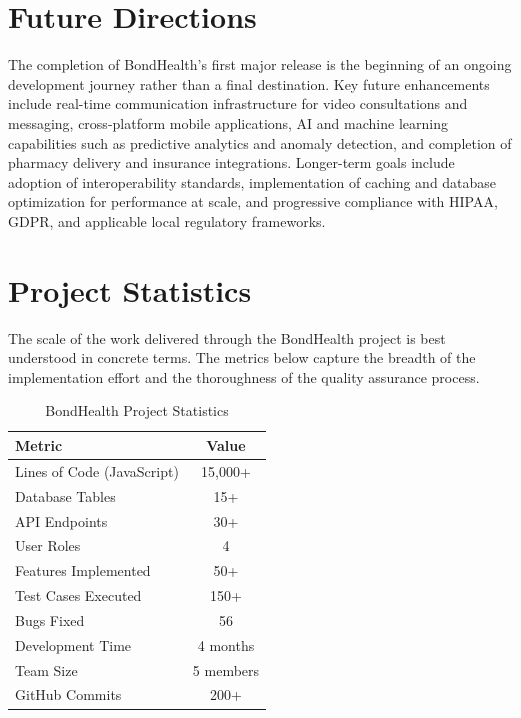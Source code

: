 \section{Future Directions}

\noindent The completion of BondHealth's first major release is the beginning of an ongoing development journey rather than a final destination. Key future enhancements include real-time communication infrastructure for video consultations and messaging, cross-platform mobile applications, AI and machine learning capabilities such as predictive analytics and anomaly detection, and completion of pharmacy delivery and insurance integrations. Longer-term goals include adoption of interoperability standards, implementation of caching and database optimization for performance at scale, and progressive compliance with HIPAA, GDPR, and applicable local regulatory frameworks.

\section{Project Statistics}

\noindent The scale of the work delivered through the BondHealth project is best understood in concrete terms. The metrics below capture the breadth of the implementation effort and the thoroughness of the quality assurance process.

\begin{table}[H]
\centering
\begin{tabular}{|l|c|}
\hline
\textbf{Metric} & \textbf{Value} \\
\hline
Lines of Code (JavaScript) & 15,000+ \\
\hline
Database Tables & 15+ \\
\hline
API Endpoints & 30+ \\
\hline
User Roles & 4 \\
\hline
Features Implemented & 50+ \\
\hline
Test Cases Executed & 150+ \\
\hline
Bugs Fixed & 56 \\
\hline
Development Time & 4 months \\
\hline
Team Size & 5 members \\
\hline
GitHub Commits & 200+ \\
\hline
\end{tabular}
\caption{BondHealth Project Statistics}
\label{tab:stats}
\end{table}

